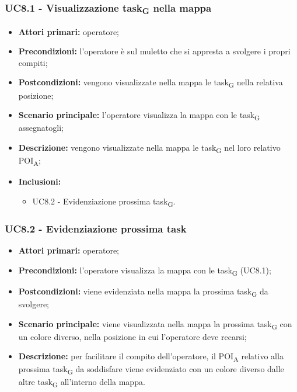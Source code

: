 \subsubsection{UC8.1 - Visualizzazione task\textsubscript{G} nella mappa}
\begin{itemize}
	\item 	\textbf{Attori primari:} operatore;
	\item 	\textbf{Precondizioni:} l'operatore è sul muletto che si appresta a svolgere i propri compiti;
	\item 	\textbf{Postcondizioni:} vengono visualizzate nella mappa le task\textsubscript{G} nella relativa posizione;
	\item 	\textbf{Scenario principale:} l'operatore visualizza la mappa con le task\textsubscript{G} assegnatogli;
	\item 	\textbf{Descrizione:} vengono visualizzate nella mappa le task\textsubscript{G} nel loro relativo POI\textsubscript{A};
	\item 	\textbf{Inclusioni:}
	\begin{itemize}
		\item UC8.2 - Evidenziazione prossima task\textsubscript{G}.
	\end{itemize}
\end{itemize}

\subsubsection{UC8.2 - Evidenziazione prossima task}
\begin{itemize}
	\item 	\textbf{Attori primari:} operatore;
	\item 	\textbf{Precondizioni:} l'operatore visualizza la mappa con le task\textsubscript{G} (UC8.1);
	\item 	\textbf{Postcondizioni:} viene evidenziata nella mappa la prossima task\textsubscript{G} da svolgere;
	\item 	\textbf{Scenario principale:} viene visualizzata nella mappa la prossima task\textsubscript{G} con un colore diverso, nella posizione in cui l'operatore deve recarsi;
	\item 	\textbf{Descrizione:} per facilitare il compito dell'operatore, il  POI\textsubscript{A} relativo alla prossima task\textsubscript{G} da soddisfare viene evidenziato con un colore diverso dalle altre task\textsubscript{G} all'interno della mappa.

\end{itemize}

